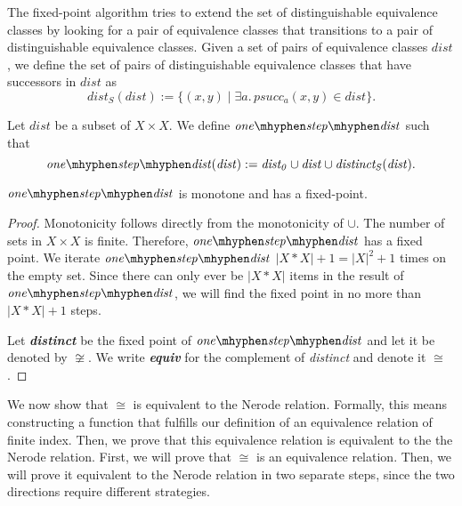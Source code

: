 The fixed-point algorithm tries to extend the set of distinguishable equivalence classes by looking for a pair of equivalence classes that transitions to a pair of distinguishable equivalence classes. 
Given a set of pairs of equivalence classes $\mathit{dist}$, 
we define the set of pairs of distinguishable equivalence classes that have successors in $\mathit{dist}$ as
\begin{equation*}
    \mathit{dist_S}(\mathit{dist}) := \{ (x,y) \; | \; \exists a. \, \mathit{psucc_a}(x,y) \in \mathit{dist}\}.
\end{equation*}

\begin{definition}
    \label{one_step_dist}
    Let $\mathit{dist}$ be a subset of $X \times X$. We define $\mathit{one\mhyphen step\mhyphen dist}$ such that
    \begin{equation*}
        \mathit{one\mhyphen step\mhyphen dist}(\mathit{dist}) := \mathit{dist_0} \cup \mathit{dist} \cup \mathit{distinct_S}(\mathit{dist}).
    \end{equation*}
\end{definition}


\begin{lemma}
    \label{dist_monotone}
    $\mathit{one\mhyphen step\mhyphen dist}$ is monotone and has a fixed-point.
\end{lemma}
\begin{proof}
    Monotonicity follows directly from the monotonicity of $\cup$. 
    The number of sets in $X \times X$ is finite. 
    Therefore, $\mathit{one\mhyphen step\mhyphen dist}$ has a fixed point.
    We iterate $\mathit{one\mhyphen step\mhyphen dist}$ $|X*X|+1 = |X|^2+1$ times on the empty set.
    Since there can only ever be $|X*X|$ items in the result of $\mathit{one\mhyphen step\mhyphen dist}$, 
    we will find the fixed point in no more than $|X*X|+1$ steps.
    
    Let \textit{\textbf{distinct}} be the fixed point of $\mathit{one\mhyphen step\mhyphen dist}$ and let it be denoted by $\not\cong$. 
We write \textit{\textbf{equiv}} for the complement of \textit{distinct} and denote it $\cong$.
\end{proof}



We now show that $\cong$ is equivalent to the Nerode relation. 
Formally, this means constructing a function that fulfills our definition
of an equivalence relation of finite index.
Then, we prove that this equivalence relation is equivalent to the the Nerode relation.
First, we will prove that $\cong$ is an equivalence relation.
Then, we will prove it equivalent to the Nerode relation in two separate steps, 
since the two directions require different strategies.

